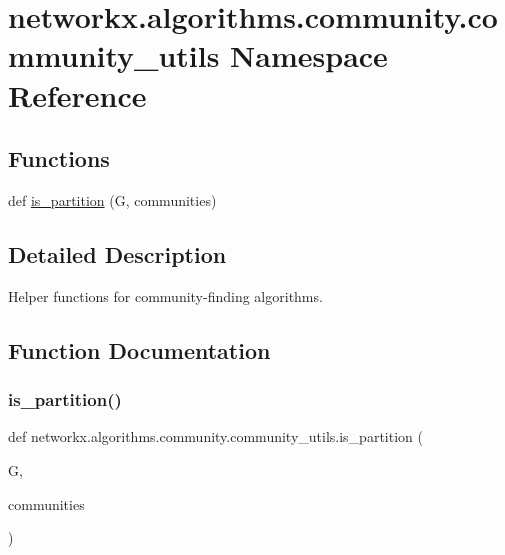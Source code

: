 \hypertarget{namespacenetworkx_1_1algorithms_1_1community_1_1community__utils}{}\section{networkx.\+algorithms.\+community.\+community\+\_\+utils Namespace Reference}
\label{namespacenetworkx_1_1algorithms_1_1community_1_1community__utils}
\subsection*{Functions}
\begin{DoxyCompactItemize}
\item 
def \hyperlink{namespacenetworkx_1_1algorithms_1_1community_1_1community__utils_ae32355e95001cc43de9c489dc0dd8cf8}{is\+\_\+partition} (G, communities)
\end{DoxyCompactItemize}


\subsection{Detailed Description}
\begin{DoxyVerb}Helper functions for community-finding algorithms.\end{DoxyVerb}
 

\subsection{Function Documentation}
\mbox{\label{namespacenetworkx_1_1algorithms_1_1community_1_1community__utils_ae32355e95001cc43de9c489dc0dd8cf8}} 
\subsubsection{\texorpdfstring{is\+\_\+partition()}{is\_partition()}}
{\footnotesize\ttfamily def networkx.\+algorithms.\+community.\+community\+\_\+utils.\+is\+\_\+partition (\begin{DoxyParamCaption}\item[{}]{G,  }\item[{}]{communities }\end{DoxyParamCaption})}

